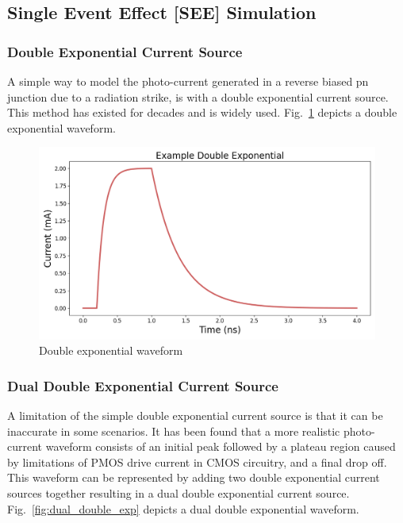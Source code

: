 \documentclass[conference]{IEEEtran}
\begin{document}
    \vspace{1em}

    \subsection{Single Event Effect [SEE] Simulation}\label{subsec:single-event-effect-[see]-simulation}

    \subsubsection{Double Exponential Current Source}
    A simple way to model the photo-current generated in a reverse biased pn junction due to a radiation strike, is with a double exponential current source.
    This method has existed for decades and is widely used.
    Fig.~\ref{fig:double_exp} depicts a double exponential waveform.

    \begin{figure}[htbp]
        \centering
        \includegraphics[width=0.95\linewidth]{EX_Double_Exponential}
        \caption{Double exponential waveform}
        \label{fig:double_exp}
    \end{figure}

    \subsubsection{Dual Double Exponential Current Source}
    A limitation of the simple double exponential current source is that it can be inaccurate in some scenarios.
    It has been found that a more realistic photo-current waveform consists of an initial peak followed by a plateau region caused by limitations of PMOS drive current in CMOS circuitry, and a final drop off.
    This waveform can be represented by adding two double exponential current sources together resulting in a dual double exponential current source.
    Fig.~\ref{fig:dual_double_exp} depicts a dual double exponential waveform. \cite{Black2015}
    \vspace{1em}
\end{document}
